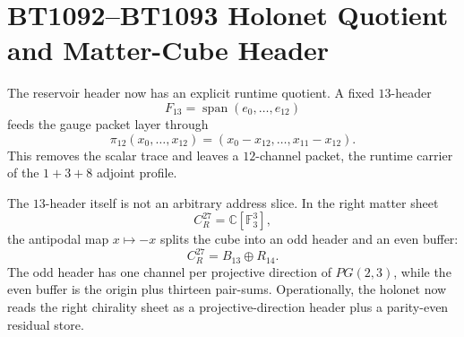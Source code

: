 \section{BT1092--BT1093 Holonet Quotient and Matter-Cube Header}
\label{sec:bt1092-bt1093-holonet-quotient-cube}

The reservoir header now has an explicit runtime quotient.  A fixed $13$-header
\[
F_{13}=\operatorname{span}(e_0,\ldots,e_{12})
\]
feeds the gauge packet layer through
\[
\pi_{12}(x_0,\ldots,x_{12})=(x_0-x_{12},\ldots,x_{11}-x_{12}).
\]
This removes the scalar trace and leaves a $12$-channel packet, the runtime carrier of the $1+3+8$ adjoint profile.

The $13$-header itself is not an arbitrary address slice.  In the right matter sheet
\[
C^{27}_R=\mathbb C[\mathbb F_3^3],
\]
the antipodal map $x\mapsto -x$ splits the cube into an odd header and an even buffer:
\[
C^{27}_R=B_{13}\oplus R_{14}.
\]
The odd header has one channel per projective direction of $PG(2,3)$, while the even buffer is the origin plus thirteen pair-sums.  Operationally, the holonet now reads the right chirality sheet as a projective-direction header plus a parity-even residual store.
